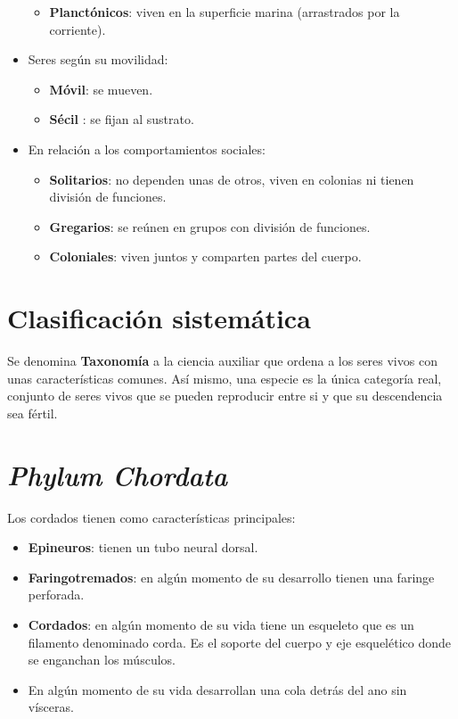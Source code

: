 \begin{itemize}[itemsep=0pt,parsep=0pt,topsep=0pt,partopsep=0pt]
\begin{itemize}[itemsep=0pt,parsep=0pt,topsep=0pt,partopsep=0pt]
        \item\textbf{Planctónicos}: viven en la superficie marina (arrastrados por la corriente).
    \end{itemize}
    \item Seres según su movilidad:
    \begin{itemize}[itemsep=0pt,parsep=0pt,topsep=0pt,partopsep=0pt]
        \item\textbf{Móvil}: se mueven.
        \item\textbf{Sécil} : se fijan al sustrato.
    \end{itemize}
    \item En relación a los comportamientos sociales:
    \begin{itemize}[itemsep=0pt,parsep=0pt,topsep=0pt,partopsep=0pt]
        \item \textbf{Solitarios}: no dependen unas de otros, viven en colonias ni tienen división de funciones.
        \item\textbf{Gregarios}: se reúnen en grupos con división de funciones.
        \item\textbf{Coloniales}: viven juntos y comparten partes del cuerpo.
    \end{itemize}
\end{itemize}
\section{Clasificación sistemática}
Se denomina \textbf{Taxonomía} a la ciencia auxiliar que ordena a los seres vivos con unas características comunes. Así mismo, una especie es la única categoría real, conjunto de seres vivos que se pueden reproducir entre si y que su descendencia sea fértil.
\section{\textit{Phylum Chordata}}
Los cordados tienen como características principales:
\begin{itemize}[itemsep=0pt,parsep=0pt,topsep=0pt,partopsep=0pt]
    \item \textbf{Epineuros}: tienen un tubo neural dorsal.
    \item\textbf{Faringotremados}: en algún momento de su desarrollo tienen una faringe perforada.
    \item\textbf{Cordados}: en algún momento de su vida tiene un esqueleto que es un filamento denominado corda. Es el soporte del cuerpo y eje esquelético donde se enganchan los músculos.
    \item En algún momento de su vida desarrollan una cola detrás del ano sin vísceras.
\end{itemize}
